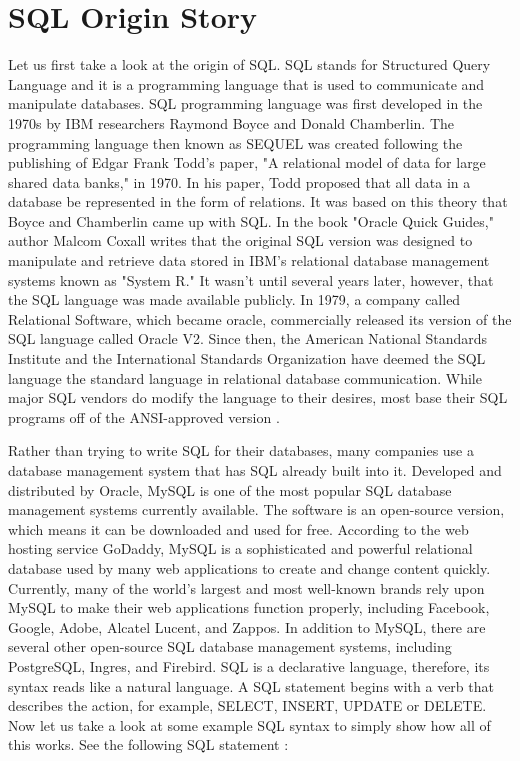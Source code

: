 \section{SQL Origin Story}
\label{sec:origin story}

Let us first take a look at the origin of SQL. SQL stands for Structured Query Language and it is a programming language that is used to communicate and manipulate databases. SQL programming language was first developed in the 1970s by IBM researchers Raymond Boyce and Donald Chamberlin. The programming language then known as SEQUEL was created following the publishing of Edgar Frank Todd's paper, "A relational model of data for large shared data banks," in 1970. In his paper, Todd proposed that all data in a database be represented in the form of relations. It was based on this theory that Boyce and Chamberlin came up with SQL. In the book "Oracle Quick Guides," author Malcom Coxall writes that the original SQL version was designed to manipulate and retrieve data stored in IBM's relational database management systems known as "System R." It wasn't until several years later, however, that the SQL language was made available publicly. In 1979, a company called Relational Software, which became oracle, commercially released its version of the SQL language called Oracle V2. Since then, the American National Standards Institute and the International Standards Organization have deemed the SQL language the standard language in relational database communication. While major SQL vendors do modify the language to their desires, most base their SQL programs off of the ANSI-approved version \cite{brooks_2014}.




Rather than trying to write SQL for their databases, many companies use a database management system that has SQL already built into it. Developed and distributed by Oracle, MySQL is one of the most popular SQL database management systems currently available. The software is an open-source version, which means it can be downloaded and used for free. According to the web hosting service GoDaddy, MySQL is a sophisticated and powerful relational database used by many web applications to create and change content quickly. Currently, many of the world's largest and most well-known brands rely upon MySQL to make their web applications function properly, including Facebook, Google, Adobe, Alcatel Lucent, and Zappos. In addition to MySQL, there are several other open-source SQL database management systems, including PostgreSQL, Ingres, and Firebird. SQL is a declarative language, therefore, its syntax reads like a natural language. A SQL statement begins with a verb that describes the action, for example, SELECT, INSERT, UPDATE or DELETE. Now let us take a look at some example SQL syntax to simply show how all of this works. See the following SQL statement :

